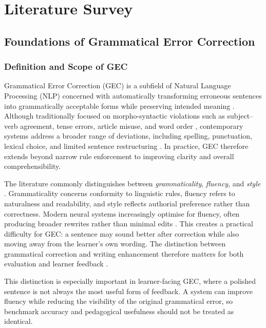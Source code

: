 \chapter{Literature Survey}

\section{Foundations of Grammatical Error Correction}

\subsection{Definition and Scope of GEC}

Grammatical Error Correction (GEC) is a subfield of Natural Language Processing (NLP) concerned with automatically transforming erroneous sentences into grammatically acceptable forms while preserving intended meaning \cite{ng-etal-2014-conll}. Although traditionally focused on morpho-syntactic violations such as subject--verb agreement, tense errors, article misuse, and word order \cite{bryant-etal-2017-automatic}, contemporary systems address a broader range of deviations, including spelling, punctuation, lexical choice, and limited sentence restructuring \cite{10.1162/coli_a_00478}. In practice, GEC therefore extends beyond narrow rule enforcement to improving clarity and overall comprehensibility.

The literature commonly distinguishes between \textit{grammaticality}, \textit{fluency}, and \textit{style} \cite{napoles-etal-2017-jfleg}. Grammaticality concerns conformity to linguistic rules, fluency refers to naturalness and readability, and style reflects authorial preference rather than correctness. Modern neural systems increasingly optimise for fluency, often producing broader rewrites rather than minimal edits \cite{loem2023exploringeffectivenessgpt3grammatical}. This creates a practical difficulty for GEC: a sentence may sound better after correction while also moving away from the learner's own wording. The distinction between grammatical correction and writing enhancement therefore matters for both evaluation and learner feedback \cite{ke2019automated}.

This distinction is especially important in learner-facing GEC, where a polished sentence is not always the most useful form of feedback. A system can improve fluency while reducing the visibility of the original grammatical error, so benchmark accuracy and pedagogical usefulness should not be treated as identical.

